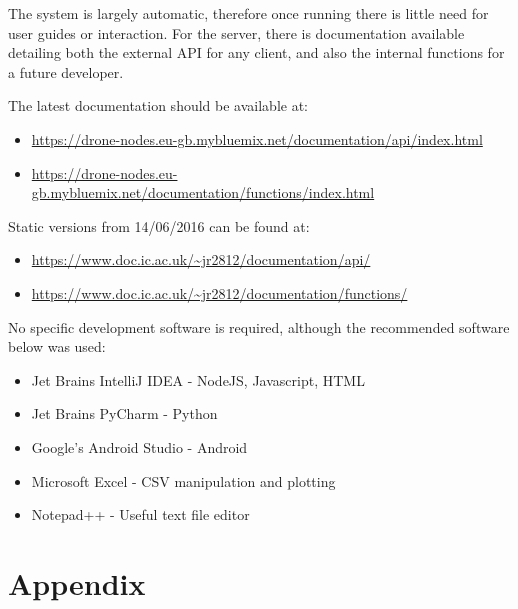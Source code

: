 \documentclass{article}
\begin{document}
\vspace{\baselineskip}

The system is largely automatic, therefore once running there is little need for user guides or interaction. For the server, there is documentation available detailing both the external API for any client, and also the internal functions for a future developer. 

The latest documentation should be available at:
\begin{itemize}
	\item \url{https://drone-nodes.eu-gb.mybluemix.net/documentation/api/index.html}
	\item \url{https://drone-nodes.eu-gb.mybluemix.net/documentation/functions/index.html}
\end{itemize}
Static versions from 14/06/2016 can be found at:
\begin{itemize}
	\item \url{https://www.doc.ic.ac.uk/~jr2812/documentation/api/}
	\item \url{https://www.doc.ic.ac.uk/~jr2812/documentation/functions/}
\end{itemize}

\vspace{\baselineskip}

No specific development software is required, although the recommended software below was used:
\begin{itemize}
	\item Jet Brains IntelliJ IDEA - NodeJS, Javascript, HTML
	\item Jet Brains PyCharm - Python
	\item Google's Android Studio - Android
	\item Microsoft Excel - CSV manipulation and plotting
	\item Notepad++ - Useful text file editor
\end{itemize}



\section{Appendix}
\end{document}

